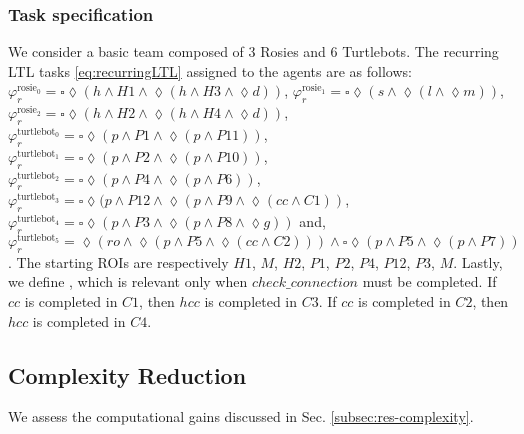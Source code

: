 \subsubsection{Task specification}\label{subsec:exp-task}
We consider a basic team composed of 3 Rosies and 6 Turtlebots. The recurring LTL tasks \eqref{eq:recurringLTL} assigned to the agents are as follows:     $\varphi^{\mathrm{rosie}_0}_r=\square\lozenge(h \wedge H1 \wedge \lozenge(h \wedge H3\wedge\lozenge d))$,    $\varphi^{\mathrm{rosie}_1}_r=\square\lozenge(s \wedge \lozenge(l \wedge\lozenge m))$,         $\varphi^{\mathrm{rosie}_2}_r=\square\lozenge(h \wedge H2 \wedge \lozenge(h \wedge H4\wedge\lozenge d))$,             $\varphi^{\mathrm{turtlebot}_0}_r=\square\lozenge(p \wedge P1 \wedge \lozenge(p\wedge P11))$,             $\varphi^{\mathrm{turtlebot}_1}_r=\square\lozenge(p \wedge P2 \wedge \lozenge(p\wedge P10))$,             $\varphi^{\mathrm{turtlebot}_2}_r=\square\lozenge(p \wedge P4 \wedge \lozenge(p \wedge P6))$,             $\varphi^{\mathrm{turtlebot}_3}_r=\square\lozenge(p \wedge P12 \wedge \lozenge(p\wedge P9\wedge \lozenge(cc \wedge C1))$,      $\varphi^{\mathrm{turtlebot}_4}_r=\square\lozenge(p \wedge P3 \wedge \lozenge(p\wedge P8\wedge \lozenge g))$ and, $\varphi^{\mathrm{turtlebot}_5}_r=\lozenge (ro \wedge \lozenge(p \wedge P5 \wedge \lozenge(cc \wedge C2))) \wedge\square\lozenge(p \wedge P5 \wedge \lozenge(p\wedge P7))$. The starting ROIs are respectively $H1$, $M$, $H2$, $P1$, $P2$, $P4$, $P12$, $P3$, $M$.
Lastly, we define \ChooseROI, which is relevant only when $check\_connection$ must be completed. If $cc$ is completed in $C1$, then $hcc$ is completed in $C3$. If $cc$ is completed in $C2$, then $hcc$ is completed in $C4$. 
\subsection{Complexity Reduction}\label{subsec:exp-complexity}
We assess the computational gains discussed in Sec. \ref{subsec:res-complexity}.
